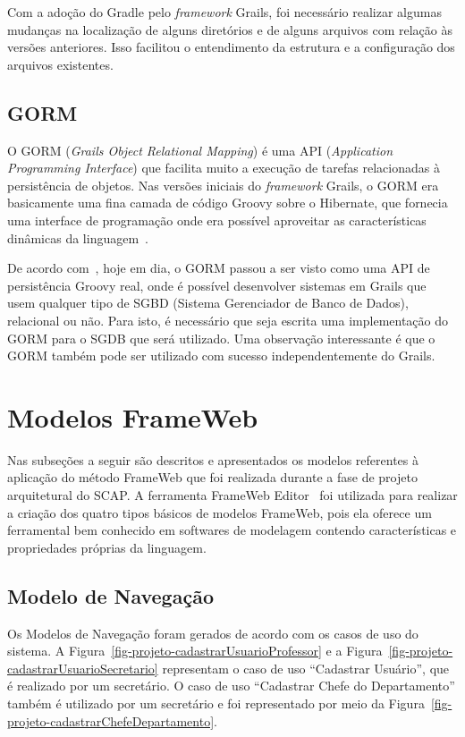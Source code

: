 Com a adoção do Gradle pelo \textit{framework} Grails, foi necessário realizar algumas mudanças na localização de alguns diretórios e de alguns arquivos com relação às versões anteriores. Isso facilitou o entendimento da estrutura e a configuração dos arquivos existentes.

\subsection{GORM}
\label{sec-projeto-gorm}

O GORM (\textit{Grails Object Relational Mapping}) é uma API (\textit{Application Programming Interface}) que facilita muito a execução de tarefas relacionadas à persistência de objetos. Nas versões iniciais do \textit{framework} Grails, o GORM era basicamente uma fina camada de código Groovy sobre o Hibernate, que fornecia uma interface de programação onde era possível aproveitar as características dinâmicas da linguagem~\cite{weissmann:fgapdw15}.

De acordo com~, hoje em dia, o GORM passou a ser visto como uma API de persistência Groovy real, onde é possível desenvolver sistemas em Grails que usem qualquer tipo de SGBD (Sistema Gerenciador de Banco de Dados), relacional ou não. Para isto, é necessário que seja escrita uma implementação do GORM para o SGDB que será utilizado. Uma observação interessante é que o GORM também pode ser utilizado com sucesso independentemente do Grails.  

\section{Modelos FrameWeb}
\label{sec-projeto-modelos-frameweb}

Nas subseções a seguir são descritos e apresentados os modelos referentes à aplicação do método FrameWeb que foi realizada durante a fase de projeto arquitetural do SCAP. A ferramenta FrameWeb Editor~\cite{campos-souza:webmedia17} foi utilizada para realizar a criação dos quatro tipos básicos de modelos FrameWeb, pois ela oferece um ferramental bem conhecido em softwares de modelagem contendo características e propriedades próprias da linguagem.  

\subsection{Modelo de Navegação}
\label{sec-projeto-modelo-navegacao}

Os Modelos de Navegação foram gerados de acordo com os casos de uso do sistema. A Figura~\ref{fig-projeto-cadastrarUsuarioProfessor} e a Figura~\ref{fig-projeto-cadastrarUsuarioSecretario} representam o caso de uso ``Cadastrar Usuário'', que é realizado por um secretário. O caso de uso ``Cadastrar Chefe do Departamento'' também é utilizado por um secretário e foi representado por meio da Figura~\ref{fig-projeto-cadastrarChefeDepartamento}. 

